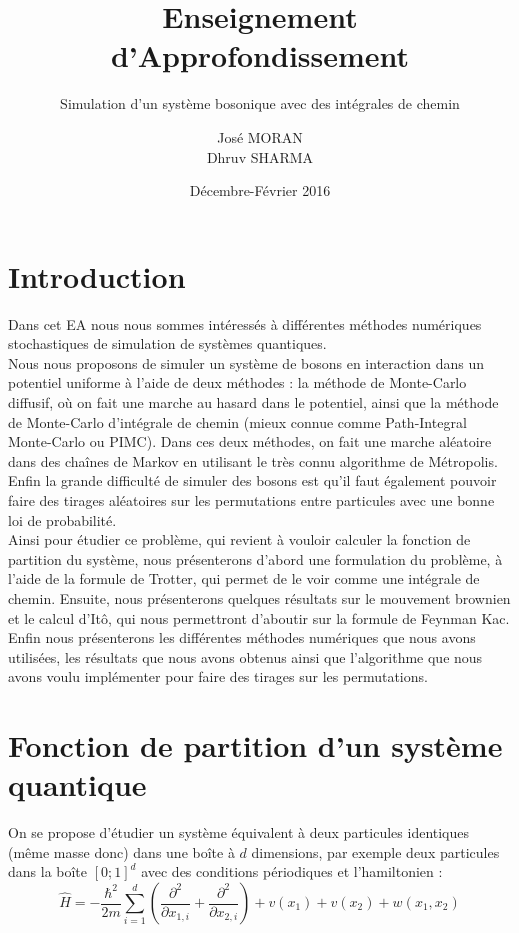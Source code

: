 \documentclass[11pt]{article}
\title{Enseignement d'Approfondissement}
\date{Décembre-Février 2016}
\author{José MORAN \\ Dhruv SHARMA}
\subtitle{Simulation d'un système bosonique avec des intégrales de chemin}
\theoremstyle{definition}
\theoremstyle{remark}
\newcommand{\hham}{\hat{H}}
\begin{document}
\maketitle
\newpage
\tableofcontents
\newpage
\section*{Introduction}
Dans cet EA nous nous sommes intéressés à différentes méthodes numériques stochastiques de simulation de systèmes quantiques. \\

Nous nous proposons de simuler un système de bosons en interaction dans un potentiel uniforme à l'aide de deux méthodes : la méthode de Monte-Carlo diffusif, où on fait une marche au hasard dans le potentiel, ainsi que la méthode de Monte-Carlo d'intégrale de chemin (mieux connue comme Path-Integral Monte-Carlo ou PIMC). Dans ces deux méthodes, on fait une marche aléatoire dans des chaînes de Markov en utilisant le très connu algorithme de Métropolis. Enfin la grande difficulté de simuler des bosons est qu'il faut également pouvoir faire des tirages aléatoires sur les permutations entre particules avec une bonne loi de probabilité. 
\\

Ainsi pour étudier ce problème, qui revient à vouloir calculer la fonction de partition du système, nous présenterons d'abord une formulation du problème, à l'aide de la formule de Trotter, qui permet de le voir comme une intégrale de chemin. Ensuite, nous présenterons quelques résultats sur le mouvement brownien et le calcul d'Itô, qui nous permettront d'aboutir sur la formule de Feynman Kac. Enfin nous présenterons les différentes méthodes numériques que nous avons utilisées, les résultats que nous avons obtenus ainsi que l'algorithme que nous avons voulu implémenter pour faire des tirages sur les permutations.

\newpage
\section{Fonction de partition d'un système quantique}\label{sec:part}
On se propose d'étudier un système équivalent à deux particules identiques (même masse donc) dans une boîte à $d$ dimensions, par exemple deux particules dans la boîte $[0;1]^d$ avec des conditions périodiques et l'hamiltonien :
\begin{equation}
\hham = -\frac{\hbar^2}{2m}\sum_{i=1}^{d}\left( \frac{\partial^2}{\partial x_{1,i}}+\frac{\partial^2}{\partial x_{2,i}}\right)+v(x_1)+v(x_2)+w(x_1,x_2)
\end{equation}
\end{document}
